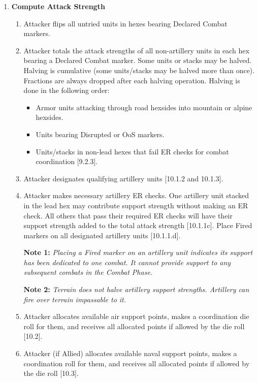 \begin{enumerate}[label=\textbf{\Roman*.}]
    \item \textbf{Compute Attack Strength}
    \begin{enumerate}[label=\alph*.]
        \item Attacker flips all untried units in hexes bearing Declared Combat markers.
        \item Attacker totals the attack strengths of all non-artillery units in each hex bearing a Declared Combat marker. Some units or stacks may be halved. Halving is cumulative (some units/stacks may be halved more than once). Fractions are always dropped after each halving operation. Halving is done in the following order:
        \begin{itemize}
            \item Armor units attacking through road hexsides into mountain or alpine hexsides.
            \item Units bearing Disrupted or OoS markers.
            \item Units/stacks in non-lead hexes that fail ER checks for combat coordination [9.2.3].
        \end{itemize}
        \item Attacker designates qualifying artillery units [10.1.2 and 10.1.3].
        \item Attacker makes necessary artillery ER checks. One artillery unit stacked in the lead hex may contribute support strength without making an ER check. All others that pass their required ER checks will have their support strength added to the total attack strength [10.1.1c]. Place Fired markers on all designated artillery units [10.1.1.d].
        
        \textbf{Note 1:} \textit{Placing a Fired marker on an artillery unit indicates its support has been dedicated to one combat. It cannot provide support to any subsequent combats in the Combat Phase.}
        
        \textbf{Note 2:} \textit{Terrain does not halve artillery support strengths. Artillery can fire over terrain impassable to it.}
        \item Attacker allocates available air support points, makes a coordination die roll for them, and receives all allocated points if allowed by the die roll [10.2].
        \item Attacker (if Allied) allocates available naval support points, makes a coordination roll for them, and receives all allocated points if allowed by the die roll [10.3].
        

\end{enumerate}
\end{enumerate}

